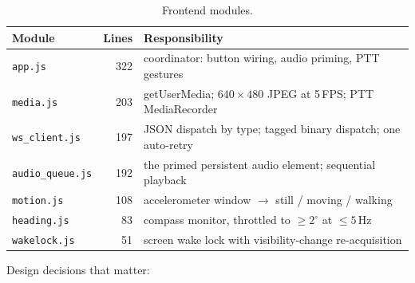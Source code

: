 \begin{table}[!htbp]
\centering
\caption[Frontend modules]{Frontend modules.}
\label{tab:frontend_modules}
\small
\begin{tabular}{l r p{7.8cm}}
\toprule
\textbf{Module} & \textbf{Lines} & \textbf{Responsibility} \\
\midrule
\texttt{app.js}         & 322 & coordinator: button wiring, audio priming, PTT gestures \\
\texttt{media.js}       & 203 & getUserMedia; $640\times480$ JPEG at 5\,FPS; PTT MediaRecorder \\
\texttt{ws\_client.js}  & 197 & JSON dispatch by type; tagged binary dispatch; one auto-retry \\
\texttt{audio\_queue.js}& 192 & the primed persistent audio element; sequential playback \\
\texttt{motion.js}      & 108 & accelerometer window $\to$ still / moving / walking \\
\texttt{heading.js}     &  83 & compass monitor, throttled to ${\geq}2^\circ$ at ${\leq}5$\,Hz \\
\texttt{wakelock.js}    &  51 & screen wake lock with visibility-change re-acquisition \\
\bottomrule
\end{tabular}
\end{table}

Design decisions that matter:

